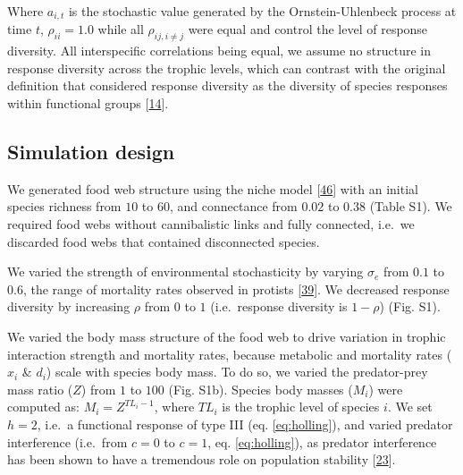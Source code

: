\documentclass[
]{article}
\begin{document}
Where \(a_{i,t}\) is the stochastic value generated by the Ornstein-Uhlenbeck process
at time \(t\), \(\rho_{ii} = 1.0\) while all \(\rho_{ij, i \neq j}\) were equal and
control the level of response diversity. All interspecific correlations being
equal, we assume no structure in response diversity across the trophic levels,
which can contrast with the original definition that considered response
diversity as the diversity of species responses within functional groups
{[}\protect\hyperlink{ref-elmqvist_response_2003}{14}{]}.

\hypertarget{simulation-design}{%
\subsection{Simulation design}\label{simulation-design}}

We generated food web structure using the niche model {[}\protect\hyperlink{ref-williams_simple_2000}{46}{]}
with an initial species richness from \(10\) to \(60\), and
connectance from \(0.02\) to \(0.38\) (Table S1). We required
food webs without cannibalistic links and fully connected, i.e.~we discarded
food webs that contained disconnected species.

We varied the strength of environmental stochasticity by varying \(\sigma_e\) from
\(0.1\) to \(0.6\), the range of mortality rates observed in
protists {[}\protect\hyperlink{ref-vasseur_environmental_2007}{39}{]}. We decreased response diversity by
increasing \(\rho\) from \(0\) to \(1\) (i.e.~response
diversity is \(1 - \rho\)) (Fig. S1).

We varied the body mass structure of the food web to drive variation in trophic
interaction strength and mortality rates, because metabolic and mortality rates
(\(x_i\) \& \(d_i\)) scale with species body mass. To do so, we varied the
predator-prey mass ratio (\(Z\)) from \(1\) to \(100\) (Fig.
S1b). Species body masses (\(M_i\)) were computed as: \(M_i = Z^{TL_i - 1}\), where
\(TL_i\) is the trophic level of species \(i\). We set \(h = 2\), i.e.~a functional
response of type III (eq. \eqref{eq:holling}), and varied predator interference
(i.e.~from \(c = 0\) to \(c = 1\), eq. \eqref{eq:holling}),
as predator interference has been shown to have a tremendous role on population
stability {[}\protect\hyperlink{ref-brose_allometric_2006}{23}{]}.
\end{document}
